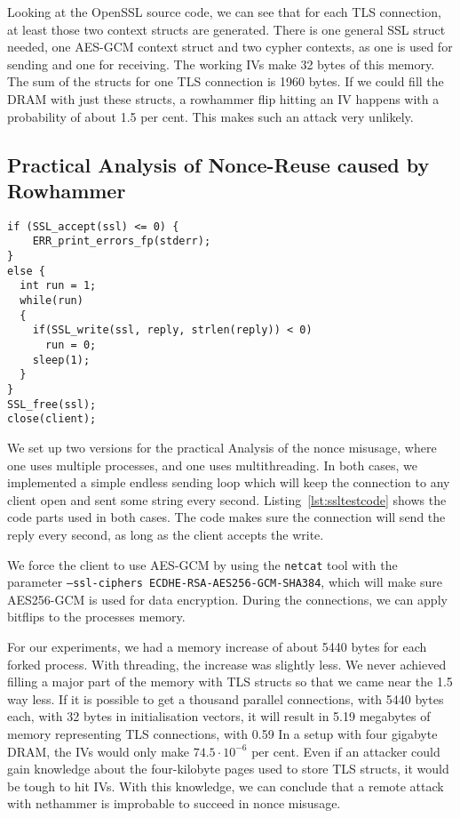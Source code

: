 Looking at the OpenSSL source code, we can see that for each TLS connection, at
least those two context structs are generated. There is one general SSL struct
needed, one AES-GCM context struct and two cypher contexts, as one is used for
sending and one for receiving. The working IVs make 32 bytes of this memory. The
sum of the structs for one TLS connection is 1960 bytes. If we could fill the
DRAM with just these structs, a rowhammer flip hitting an IV happens with a
probability of about 1.5 per cent. This makes such an attack very unlikely.

\subsection{Practical Analysis of Nonce-Reuse caused by Rowhammer}

\begin{minipage}{\linewidth}
\begin{lstlisting}[style=CStyle,
                   caption={},
                   label={lst:ssltestcode}]
if (SSL_accept(ssl) <= 0) {
    ERR_print_errors_fp(stderr);
}
else {
  int run = 1;
  while(run)
  {
    if(SSL_write(ssl, reply, strlen(reply)) < 0)
      run = 0;
    sleep(1);
  }
}
SSL_free(ssl);
close(client);
\end{lstlisting}
\end{minipage}

We set up two versions for the practical Analysis of the nonce misusage, where
one uses multiple processes, and one uses multithreading. In both cases, we
implemented a simple endless sending loop which will keep the connection to any
client open and sent some string every second. Listing~\ref{lst:ssltestcode}
shows the code parts used in both cases. The code makes sure the connection will
send the reply every second, as long as the client accepts the write.

We force the client to use AES-GCM by using the \texttt{netcat} tool with the
parameter \texttt{--ssl-ciphers ECDHE-RSA-AES256-GCM-SHA384}, which will make
sure AES256-GCM is used for data encryption. During the connections, we can
apply bitflips to the processes memory.

For our experiments, we had a memory increase of about 5440 bytes for each
forked process. With threading, the increase was slightly less. We never
achieved filling a major part of the memory with TLS structs so that we came
near the 1.5%
way less. If it is possible to get a thousand parallel connections, with 5440
bytes each, with 32 bytes in initialisation vectors, it will result in 5.19
megabytes of memory representing TLS connections, with 0.59%
In a setup with four gigabyte DRAM, the IVs would only make $74.5\cdot10^{-6}$
per cent. Even if an attacker could gain knowledge about the four-kilobyte pages
used to store TLS structs, it would be tough to hit IVs. With this knowledge, we
can conclude that a remote attack with nethammer is improbable to succeed in
nonce misusage.

